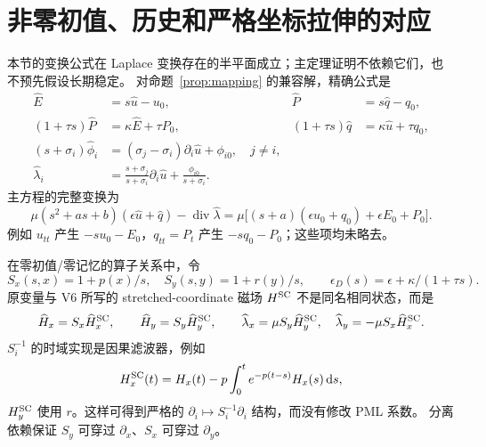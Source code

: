 \documentclass[UTF8,a4paper,11pt,fontset=none]{ctexart}
\numberwithin{equation}{section}
\theoremstyle{definition}
\theoremstyle{definition}
\newcommand{\eps}{\epsilon}
\newcommand{\dd}{\,\mathrm d}
\DeclareMathOperator{\diver}{div}
\begin{document}
\section{非零初值、历史和严格坐标拉伸的对应}
\label{sec:laplace}

本节的变换公式在 Laplace 变换存在的半平面成立；主定理证明不依赖它们，也不预先假设长期稳定。
对命题~\ref{prop:mapping} 的兼容解，精确公式是
\begin{equation}\label{eq:laplace-init}
\begin{aligned}
 \widehat E&=s\widehat u-u_0,&
 \widehat P&=s\widehat q-q_0,\\
 (1+\tau s)\widehat P&=\kappa\widehat E+\tau P_0,&
 (1+\tau s)\widehat q&=\kappa\widehat u+\tau q_0,\\
 (s+\sigma_i)\widehat\phi_i
 &=(\sigma_j-\sigma_i)\partial_i\widehat u+\phi_{i0},\quad j\ne i,\\
 \widehat\lambda_i&=\frac{s+\sigma_j}{s+\sigma_i}\partial_i\widehat u
                 +\frac{\phi_{i0}}{s+\sigma_i}.
\end{aligned}
\end{equation}
主方程的完整变换为
\begin{equation}\label{eq:lap-main}
 \mu(s^2+as+b)(\eps\widehat u+\widehat q)-\diver\widehat\lambda
 =\mu\big[(s+a)(\eps u_0+q_0)+\eps E_0+P_0\big].
\end{equation}
例如 $u_{tt}$ 产生 $-su_0-E_0$，$q_{tt}=P_t$ 产生 $-sq_0-P_0$；这些项均未略去。

在零初值/零记忆的算子关系中，令
\[
 S_x(s,x)=1+p(x)/s,\quad S_y(s,y)=1+r(y)/s,\qquad
 \eps_D(s)=\eps+\kappa/(1+\tau s).
\]
原变量与 V6 所写的 stretched-coordinate 磁场 $H^{\rm SC}$ 不是同名相同状态，而是
\begin{equation}\label{eq:sc-map}
 \widehat H_x=S_x\widehat H_x^{\rm SC},\qquad
 \widehat H_y=S_y\widehat H_y^{\rm SC},\qquad
 \widehat\lambda_x=\mu S_y\widehat H_y^{\rm SC},\quad
 \widehat\lambda_y=-\mu S_x\widehat H_x^{\rm SC}.
\end{equation}
$S_i^{-1}$ 的时域实现是因果滤波器，例如
\[
 H_x^{\rm SC}(t)=H_x(t)-p\int_0^t e^{-p(t-s)}H_x(s)\dd s,
\]
$H_y^{\rm SC}$ 使用 $r$。这样可得到严格的 $\partial_i\mapsto S_i^{-1}\partial_i$ 结构，而没有修改 PML 系数。
分离依赖保证 $S_y$ 可穿过 $\partial_x$、$S_x$ 可穿过 $\partial_y$。
\end{document}
